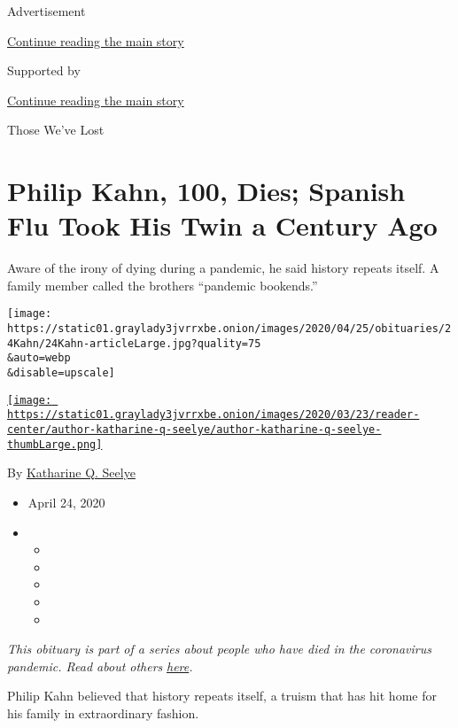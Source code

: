 Advertisement

\protect\hyperlink{after-top}{Continue reading the main story}

Supported by

\protect\hyperlink{after-sponsor}{Continue reading the main story}

Those We've Lost

\hypertarget{philip-kahn-100-dies-spanish-flu-took-his-twin-a-century-ago}{%
\section{Philip Kahn, 100, Dies; Spanish Flu Took His Twin a Century
Ago}\label{philip-kahn-100-dies-spanish-flu-took-his-twin-a-century-ago}}

Aware of the irony of dying during a pandemic, he said history repeats
itself. A family member called the brothers ``pandemic bookends.''

\texttt{[image: https://static01.graylady3jvrrxbe.onion/images/2020/04/25/obituaries/24Kahn/24Kahn-articleLarge.jpg?quality=75\\\&auto=webp\\\&disable=upscale]}

\href{https://www.nytimes3xbfgragh.onion/by/katharine-q-seelye}{\texttt{[image: https://static01.graylady3jvrrxbe.onion/images/2020/03/23/reader-center/author-katharine-q-seelye/author-katharine-q-seelye-thumbLarge.png]}}

By
\href{https://www.nytimes3xbfgragh.onion/by/katharine-q-seelye}{Katharine
Q. Seelye}

\begin{itemize}
\item
  April 24, 2020
\item
  \begin{itemize}
  \item
  \item
  \item
  \item
  \item
  \end{itemize}
\end{itemize}

\emph{This obituary is part of a series about people who have died in
the coronavirus pandemic. Read about others}
\href{https://www.nytimes3xbfgragh.onion/series/people-who-have-died-of-the-coronavirus}{\emph{here}}\emph{.}

Philip Kahn believed that history repeats itself, a truism that has hit
home for his family in extraordinary fashion.

